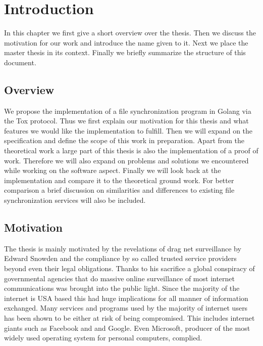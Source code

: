 \chapter{Introduction}
\label{chap:Introduction}

In this chapter we first give a short overview over the thesis.
Then we discuss the motivation for our work and introduce the name given to it.
Next we place the master thesis in its context.
Finally we briefly summarize the structure of this document.

\section{Overview}

We propose the implementation of a file synchronization program in Golang via the Tox protocol.
Thus we first explain our motivation for this thesis and what features we would like the implementation to fulfill.
Then we will expand on the specification and define the scope of this work in preparation.
Apart from the theoretical work a large part of this thesis is also the implementation of a proof of work.
Therefore we will also expand on problems and solutions we encountered while working on the software aspect.
Finally we will look back at the implementation and compare it to the theoretical ground work.
For better comparison a brief discussion on similarities and differences to existing file synchronization services will also be included.

\section{Motivation}
\label{sec:Motivation}

The thesis is mainly motivated by the revelations of drag net surveillance by Edward Snowden and the compliance by so called trusted service providers beyond even their legal obligations.
Thanks to his sacrifice a global conspiracy of governmental agencies that do massive online surveillance of most internet communications was brought into the public light.
Since the majority of the internet is USA based this had huge implications for all manner of information exchanged.
Many services and programs used by the majority of internet users has been shown to be either at risk of being compromised.
This includes internet giants such as Facebook and and Google\cite{web:site:tg:internet_giants}.
Even Microsoft, producer of the most widely used operating system for personal computers, complied\cite{web:site:tg:microsoft}.

